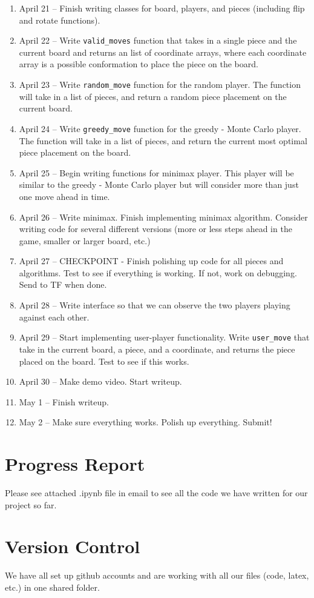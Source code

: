 \documentclass[11pt]{article}
\begin{document}
\begin{enumerate}
	\item April 21 -- Finish writing classes for board, players, and pieces (including flip and rotate functions). 
	\item April 22 -- Write \texttt{valid\_moves} function that takes in a single piece and the current board and returns an list of coordinate arrays, where each coordinate array is a possible conformation to place the piece on the board. 
	\item April 23 -- Write \texttt{random\_move} function for the random player. The function will take in a list of pieces, and return a random piece placement on the current board. 
	\item April 24 -- Write \texttt{greedy\_move} function for the greedy - Monte Carlo player. The function will take in a list of pieces, and return the current most optimal piece placement on the board. 
	\item April 25 -- Begin writing functions for minimax player. This player will be similar to the greedy - Monte Carlo player but will consider more than just one move ahead in time.
	\item April 26 -- Write minimax. Finish implementing minimax algorithm. Consider writing code for several different versions (more or less steps ahead in the game, smaller or larger board, etc.)
	\item April 27 -- CHECKPOINT - Finish polishing up code for all pieces and algorithms. Test to see if everything is working. If not, work on debugging. Send to TF when done.
	\item April 28 -- Write interface so that we can observe the two players playing against each other.  
	\item April 29 -- Start implementing user-player functionality. Write \texttt{user\_move} that take in the current board, a piece, and a coordinate, and returns the piece placed on the board. Test to see if this works. 
	\item April 30 -- Make demo video. Start writeup.
	\item May 1 -- Finish writeup. 
	\item May 2 -- Make sure everything works. Polish up everything. Submit! 
\end{enumerate}
\section{Progress Report}
Please see attached .ipynb file in email to see all the code we have written for our project so far.
\section{Version Control}
We have all set up github accounts and are working with all our files (code, latex, etc.) in one shared folder.
\end{document}
